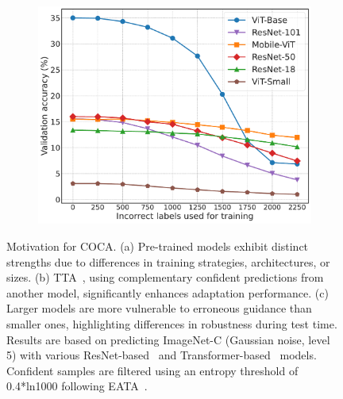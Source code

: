 \begin{figure}[t]
\begin{subfigure}[t]{0.32\textwidth}
    \includegraphics[width=\linewidth]{sec/fig1c_2.pdf}
    \label{fig1c}
\end{subfigure}

\vspace{-0.1in}
\caption{Motivation for COCA. (a) Pre-trained models exhibit distinct strengths due to differences in training strategies, architectures, or sizes. (b) TTA~\cite{wang2020tent}, using complementary confident predictions from another model, significantly enhances adaptation performance. (c) Larger models are more vulnerable to erroneous guidance than smaller ones, highlighting differences in robustness during test time. Results are based on predicting ImageNet-C (Gaussian noise, level 5) with various ResNet-based~\cite{he2016deep} and Transformer-based~\cite{dosovitskiy2020image} models. Confident samples are filtered using an entropy threshold of 0.4*ln1000 following EATA~\cite{niu2022efficient}.}
\label{motifig1}
\vspace{-0.2in}
\end{figure}



